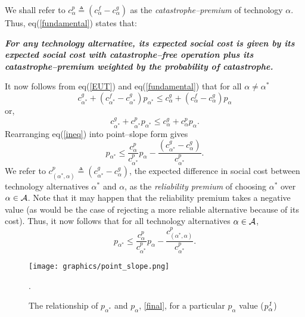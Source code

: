 \documentclass[12pt]{article}
\begin{document}
\noindent

\noindent
We shall refer to $ c_\alpha^p \triangleq (c_\alpha^f - c_\alpha^g)$ as the \emph{catastrophe--premium} of technology $\alpha$. Thus, eq(\ref{fundamental}) states that: 

\noindent
\emph{\textbf{For any technology alternative, its expected social cost is given by its expected social cost with catastrophe--free operation plus its catastrophe--premium weighted by the probability of catastrophe.}}

It now follows from eq(\ref{EUT}) and eq(\ref{fundamental}) that for all $\alpha \ne {\alpha^*}$
\begin{equation*}
  c_{\alpha^*}^g  + (c_{\alpha^*}^f - c_{\alpha^*}^g)p_{\alpha^*} \le c_\alpha^g  + (c_\alpha^f - c_\alpha^g)p_\alpha
\end{equation*}
or,
\begin{equation} \label{ineq}
  c_{\alpha^*}^g  + c_{\alpha^*}^p p_{\alpha^*} \le c_\alpha^g  + c_\alpha^p p_\alpha.
\end{equation}
Rearranging eq(\ref{ineq}) into point--slope form gives
\begin{equation*}
p_{\alpha^*} \le \frac{c_\alpha^p}{c_{\alpha^*}^p} p_\alpha - \frac{(c_{\alpha^*}^g - c_{\alpha}^g)}{c_{\alpha^*}^p}.
\end{equation*}
We refer to $c_{({\alpha^*},\alpha)}^p \triangleq (c_{\alpha^*}^g - c_{\alpha}^g)$, the expected difference in social cost  between technology alternatives $\alpha^*$ and $\alpha$, as the \emph{reliability premium} of  choosing $\alpha^*$ over $\alpha \in {\cal{A}}$.  Note that it may happen that the reliability premium takes a negative value (as would be the case of rejecting a more reliable alternative because of its cost).
Thus, it now follows that for all technology alternatives $\alpha \in {\cal{A}}$, 
\begin{equation} \label{final}
p_{\alpha^*} \le \frac{c_\alpha^p}{c_{\alpha^*}^p} p_\alpha - \frac{c_{({\alpha^*},\alpha)}^p}{c_{\alpha^*}^p}.
\end{equation}

\begin{figure}[ht]
\centering
	\texttt{[image: graphics/point\_slope.png]}
\caption{The relationship of $p_{\alpha^*}$ and $p_{\alpha}$, \eqref{final}, for a particular $p_{\alpha}$ value ($p_{\alpha}^{\text{\emph{1}}}$)}.
\label{fig:point_slope}
\end{figure}
\end{document}
